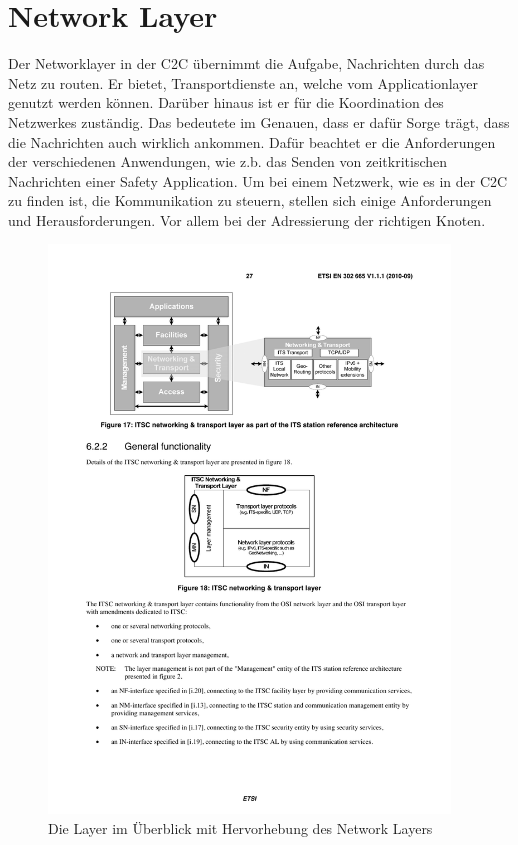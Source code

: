 \chapter{Network Layer\label{chap:networklayer}}
Der Networklayer in der \ac{C2C} übernimmt die Aufgabe, Nachrichten durch das Netz zu routen. Er bietet, Transportdienste an, welche vom Applicationlayer genutzt werden können. Darüber hinaus ist er für die Koordination des Netzwerkes zuständig.
Das bedeutete im Genauen, dass er dafür Sorge trägt, dass die Nachrichten auch wirklich ankommen. Dafür beachtet er die Anforderungen der verschiedenen Anwendungen, wie z.b. das Senden von zeitkritischen Nachrichten einer Safety Application. Um bei einem Netzwerk, wie es in der \acl{C2C} zu finden ist, die Kommunikation zu steuern, stellen sich einige Anforderungen und Herausforderungen. Vor allem bei der Adressierung der richtigen Knoten.

\begin{figure}
	\includegraphics[width=0.95\textwidth]{content/images/03_networklayer/uebersichtLayer.pdf}
	\caption{Die Layer im Überblick mit Hervorhebung des Network Layers \cite{en302665}}
\label{fig:layerUeberblick-nwLayer}
\end{figure}


